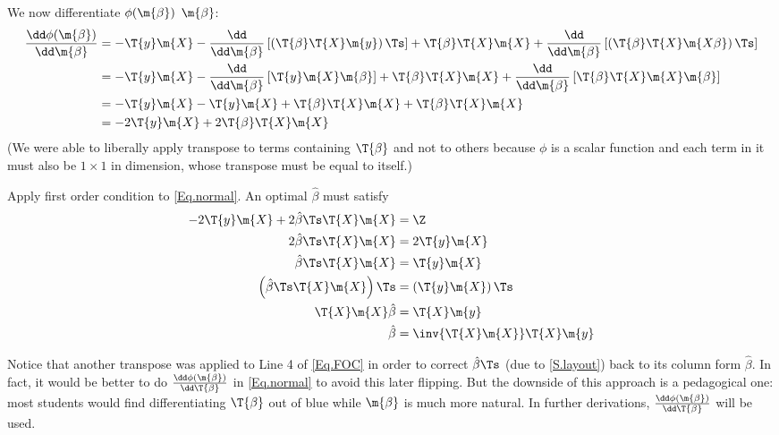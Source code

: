 We now differentiate $\phi(\m{\beta})$ \wrt $\m{\beta}$:
\begin{equation}\label{Eq.normal}
  \begin{aligned}
    \frac{\dd \phi(\m{\beta})}{\dd\m{\beta}}&=-\T{y}\m{X}-\frac{\dd}{\dd\m{\beta}}\left[\left(\T{\beta}\T{X}\m{y}\right)\Ts\right]+\T{\beta}\T{X}\m{X}+\frac{\dd}{\dd\m{\beta}}\left[\left(\T{\beta}\T{X}\m{X\beta}\right)\Ts\right]\\
    &=-\T{y}\m{X}-\frac{\dd}{\dd\m{\beta}}\left[\T{y}\m{X}\m{\beta}\right]+\T{\beta}\T{X}\m{X}+\frac{\dd}{\dd\m{\beta}}\left[\T{\beta}\T{X}\m{X}\m{\beta}\right]\\
    &=-\T{y}\m{X}-\T{y}\m{X}+\T{\beta}\T{X}\m{X}+\T{\beta}\T{X}\m{X}\\
    &=-2\T{y}\m{X}+2\T{\beta}\T{X}\m{X}
  \end{aligned}
\end{equation}
(We were able to liberally apply transpose to terms containing $\T{\beta}$ and not to others because $\phi$ is a scalar function and each term in it must also be $1\times 1$ in dimension, whose transpose must be equal to itself.)

Apply first order condition to \cref{Eq.normal}. An optimal $\hat{\beta}$ must satisfy
\begin{equation}\label{Eq.FOC}
  \begin{aligned}
    -2\T{y}\m{X}+2\hat{\beta}\Ts\T{X}\m{X}&=\Z\\
    2\hat{\beta}\Ts\T{X}\m{X}&=2\T{y}\m{X}\\
    \hat{\beta}\Ts\T{X}\m{X}&=\T{y}\m{X}\\
    \left(\hat{\beta}\Ts\T{X}\m{X}\right)\Ts&=\left(\T{y}\m{X}\right)\Ts\\
    \T{X}\m{X}\hat{\beta}&=\T{X}\m{y}\\
    \hat{\beta}&=\inv{\T{X}\m{X}}\T{X}\m{y}
  \end{aligned}
\end{equation}

Notice that another transpose was applied to Line 4 of \cref{Eq.FOC} in order to correct $\hat{\beta}\Ts$ (due to \cref{S.layout}) back to its column form $\hat{\beta}$. In fact, it would be better to do $\frac{\dd\phi(\m{\beta})}{\dd\T{\beta}}$ in \cref{Eq.normal} to avoid this later flipping. But the downside of this approach is a pedagogical one: most students would find differentiating \wrt $\T{\beta}$ out of blue while \wrt $\m{\beta}$ is much more natural. In further derivations, $\frac{\dd\phi(\m{\beta})}{\dd\T{\beta}}$ will be used.
